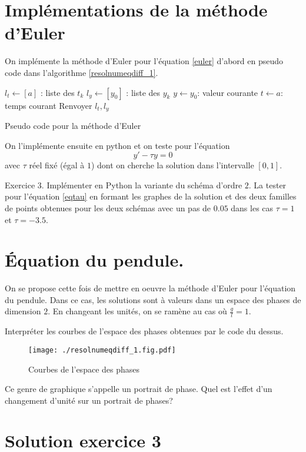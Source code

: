 \section{Implémentations de la méthode d'Euler}
On implémente la méthode d'Euler pour l'équation \eqref{euler} d'abord en pseudo code dans l'algorithme \ref{resolnumeqdiff_1}. 
\begin{algorithm}[h]
  $l_t\leftarrow [a]$ : liste des $t_k$\;
  $l_y\leftarrow [y_0]$ : liste des $y_k$\;
  $y\leftarrow y_0$: valeur courante \;
  $t\leftarrow a$: temps courant \;
  Renvoyer $l_t , l_y$\;
  \caption{Pseudo code pour la méthode d'Euler}
  \label{resolnumeqdiff_1}
\end{algorithm}
On l'implémente ensuite en python et on teste pour l'équation
\begin{equation}
  y' - \tau y =0
  \label{eqtau}
\end{equation}
avec $\tau$ réel fixé (égal à $1$) dont on cherche la solution dans l'intervalle $[0,1]$.


Exercice 3. Implémenter en Python la variante du schéma d'ordre $2$. La tester pour l'équation \eqref{eqtau} en formant les graphes de la solution et des deux familles de points obtenues pour les deux schémas avec un pas de $0.05$ dans les cas $\tau=1$ et $\tau=-3.5$.

\section{\'Equation du pendule.}
On se propose cette fois de mettre en oeuvre la méthode d'Euler pour l'équation du pendule. Dans ce cas, les solutions sont à valeurs dans un espace des phases de dimension $2$. En changeant les unités, on se ramène au cas où $\frac{g}{l}=1$. 

Interpréter les courbes de l'espace des phases obtenues par le code du dessus.
\begin{figure}[h]
  \centering
  \texttt{[image: ./resolnumeqdiff\_1.fig.pdf]}
  \caption{Courbes de l'espace des phases}
  \label{fig:resolnumeqdiff_1}
\end{figure}
Ce genre de graphique s'appelle un portrait de phase. Quel est l'effet d'un changement d'unité sur un portrait de phases?

\section{Solution exercice 3}


